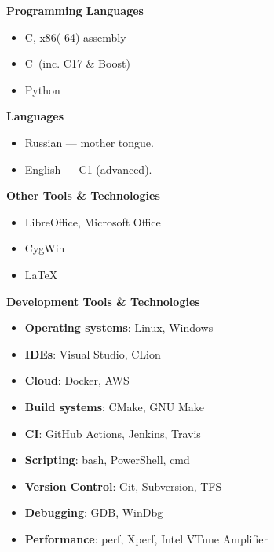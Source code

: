 \documentclass[11pt]{article}
\newcommand\CXX{C\nolinebreak[4]\hspace{-.05em}\raisebox{.4ex}{\relsize{-3}{\textbf{++}}}}
\newcommand\CvBigSkipLength{1em}
\newcommand\CvSkip[1]{\vspace{#1}}
\newcommand\CvBigSkip{\CvSkip{\CvBigSkipLength}}
\newcommand\CvSectionHeader[1]{\CvBigSkip\textbf{#1}\CvBigSkip}
\begin{document}
\begin{minipage}[t]{.5\linewidth}
  \CvSectionHeader{Programming Languages}

  \begin{itemize}
    \item C, x86(-64) assembly
    \item \CXX\ (inc. {\CXX}17 \& Boost)
    \item Python
  \end{itemize}

  \CvSectionHeader{Languages}

  \begin{itemize}
    \item Russian --- mother tongue.
    \item English --- C1 (advanced).
  \end{itemize}

  \CvSectionHeader{Other Tools \& Technologies}

  \begin{itemize}
    \item LibreOffice, Microsoft Office
    \item CygWin
    \item \LaTeX
  \end{itemize}

\end{minipage}%
\begin{minipage}[t]{.5\linewidth}
  \CvSectionHeader{Development Tools \& Technologies}

  \begin{itemize}
    \item \textbf{Operating systems}: Linux, Windows
    \item \textbf{IDEs}: Visual Studio, CLion
    \item \textbf{Cloud}: Docker, AWS
    \item \textbf{Build systems}: CMake, GNU Make
    \item \textbf{CI}: GitHub Actions, Jenkins, Travis
    \item \textbf{Scripting}: bash, PowerShell, cmd
    \item \textbf{Version Control}: Git, Subversion, TFS
    \item \textbf{Debugging}: GDB, WinDbg
    \item \textbf{Performance}: perf, Xperf, Intel VTune Amplifier
  \end{itemize}
\end{minipage}

\thispagestyle{fancy}
\end{document}
